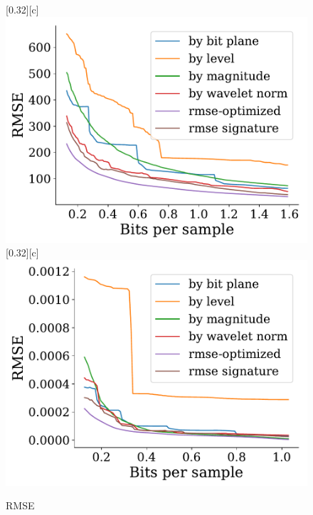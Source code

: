 \documentclass{article}
\begin{document}
\begin{figure}[htb]
        [0.32\linewidth][c]{%
               \includegraphics[width=0.3\linewidth]{img/supplementary/rmse-optimized-foam}}
        [0.32\linewidth][c]{%
                \includegraphics[width=0.3\linewidth]{img/supplementary/rmse-optimized-karfs}}
        \caption{RMSE}
\end{figure}
\end{document}
